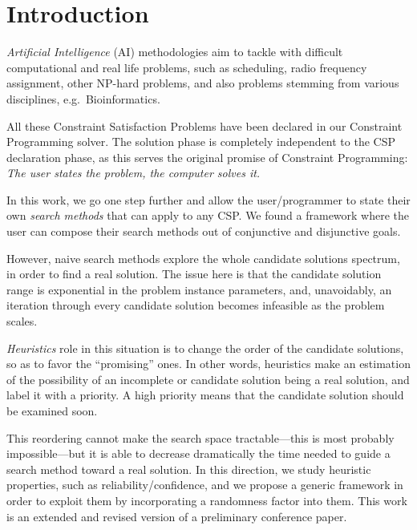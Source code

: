 \documentclass{ws-ijait}
\begin{document}


\section{Introduction}

\emph{Artificial Intelligence} (AI) methodologies aim to
tackle with difficult computational and real life problems,
such as scheduling,\cite{pinedo-scheduling} radio frequency
assignment,\cite{radio-link} other NP-hard problems, and
also problems stemming from various disciplines, e.g.\ 
Bioinformatics.\cite{bioinformatics}

All these Constraint Satisfaction Problems have been
declared in our Constraint Programming solver.\cite{Naxos}
The solution phase is completely independent to the CSP
declaration phase, as this serves the original promise of
Constraint Programming: \emph{The user states the problem,
the computer solves it.}\cite{grand-challenges}

In this work, we go one step further and allow the
user\slash programmer to state their own \emph{search
methods} that can apply to any CSP. We found a framework
where the user can compose their search methods out of
conjunctive and disjunctive goals.

However, naive search methods explore the whole candidate
solutions spectrum, in order to find a real solution. The
issue here is that the candidate solution range is
exponential in the problem instance parameters, and,
unavoidably, an iteration through every candidate solution
becomes infeasible as the problem scales.

\emph{Heuristics} role in this situation is to change the
order of the candidate solutions, so as to favor the
``promising'' ones. In other words, heuristics make an
estimation of the possibility of an incomplete or candidate
solution being a real solution, and label it with a
priority. A high priority means that the candidate solution
should be examined soon.

This reordering cannot make the search space
tractable---this is most probably
impossible\cite{p-np}---but it is able to decrease
dramatically the time needed to guide a search method toward
a real solution. In this direction, we study heuristic
properties, such as reliability\slash confidence, and we
propose a generic framework in order to exploit them by
incorporating a randomness factor into them. This work is an
extended and revised version of a preliminary conference
paper.\cite{Pothitos2016-PoPS}
\end{document}
